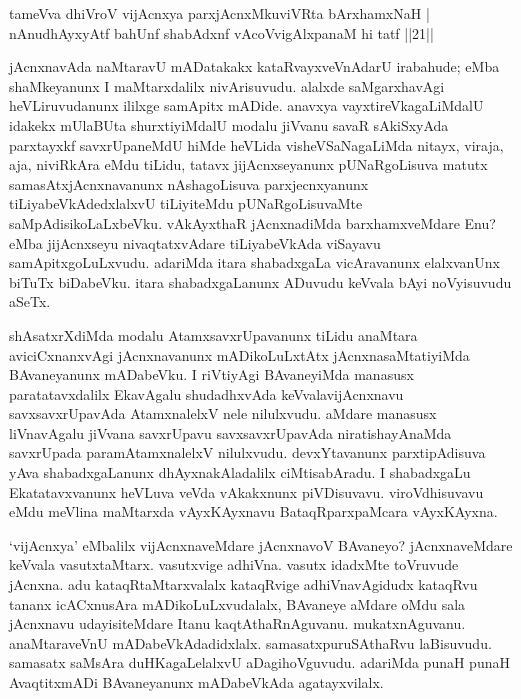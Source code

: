 
\begin{shl}
tameVva dhiVroV vijAcnxya parxjAcnxMkuviVRta bArxhamxNaH |\\
nAnudhAyxyAtf bahUnf shabAdxnf vAcoVvigAlxpanaM hi tatf ||21||
\end{shl}

\begin{artha}
jAcnxnavAda naMtaravU mADatakakx kataRvayxveVnAdarU irabahude; eMba shaMkeyanunx  I maMtarxdalilx nivArisuvudu. alalxde saMgarxhavAgi heVLiruvudanunx ililxge samApitx mADide. anavxya vayxtireVkagaLiMdalU idakekx mUlaBUta shurxtiyiMdalU modalu jiVvanu savaR sAkiSxyAda parxtayxkf savxrUpaneMdU hiMde heVLida visheVSaNagaLiMda nitayx, viraja, aja, niviRkAra eMdu tiLidu, tatavx jijAcnxseyanunx pUNaRgoLisuva matutx samasAtxjAcnxnavanunx nAshagoLisuva parxjecnxyanunx tiLiyabeVkAdedxlalxvU tiLiyiteMdu pUNaRgoLisuvaMte saMpAdisikoLaLxbeVku. vAkAyxthaR jAcnxnadiMda barxhamxveMdare Enu? eMba jijAcnxseyu nivaqtatxvAdare tiLiyabeVkAda viSayavu samApitxgoLuLxvudu. adariMda itara shabadxgaLa vicAravanunx elalxvanUnx biTuTx biDabeVku. itara shabadxgaLanunx ADuvudu keVvala bAyi noVyisuvudu aSeTx. 
\end{artha}


\begin{artha}
shAsatxrXdiMda modalu AtamxsavxrUpavanunx tiLidu anaMtara aviciCxnanxvAgi jAcnxnavanunx mADikoLuLxtAtx jAcnxnasaMtatiyiMda BAvaneyanunx mADabeVku. I riVtiyAgi BAvaneyiMda manasusx paratatavxdalilx EkavAgalu shudadhxvAda keVvalavijAcnxnavu savxsavxrUpavAda AtamxnalelxV nele nilulxvudu. aMdare manasusx liVnavAgalu jiVvana savxrUpavu savxsavxrUpavAda niratishayAnaMda savxrUpada paramAtamxnalelxV nilulxvudu. devxYtavanunx parxtipAdisuva yAva shabadxgaLanunx dhAyxnakAladalilx ciMtisabAradu. I shabadxgaLu Ekatatavxvanunx heVLuva veVda vAkakxnunx piVDisuvavu. viroVdhisuvavu eMdu meVlina maMtarxda vAyxKAyxnavu BataqRparxpaMcara vAyxKAyxna.
\end{artha}


\begin{artha}
`vijAcnxya' eMbalilx vijAcnxnaveMdare jAcnxnavoV BAvaneyo? jAcnxnaveMdare keVvala vasutxtaMtarx. vasutxvige adhiVna. vasutx idadxMte toVruvude jAcnxna. adu kataqRtaMtarxvalalx kataqRvige adhiVnavAgidudx kataqRvu tananx icACxnusAra mADikoLuLxvudalalx, BAvaneye aMdare oMdu sala jAcnxnavu udayisiteMdare Itanu kaqtAthaRnAguvanu. mukatxnAguvanu. anaMtaraveVnU mADabeVkAdadidxlalx. samasatx\break puruSAthaRvu laBisuvudu. samasatx saMsAra duHKagaLelalxvU aDagihoVguvudu. adariMda punaH punaH AvaqtitxmADi BAvaneyanunx mADabeVkAda agatayxvilalx.
\end{artha}

